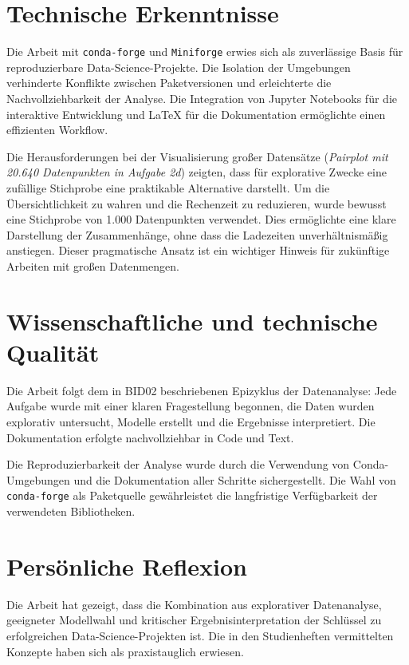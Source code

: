 \section{Technische Erkenntnisse}

Die Arbeit mit \texttt{conda-forge} und \texttt{Miniforge} erwies sich als zuverlässige Basis für reproduzierbare Data-Science-Projekte. Die Isolation der Umgebungen verhinderte Konflikte zwischen Paketversionen und erleichterte die Nachvollziehbarkeit der Analyse. Die Integration von Jupyter Notebooks für die interaktive Entwicklung und \LaTeX{} für die Dokumentation ermöglichte einen effizienten Workflow.

Die Herausforderungen bei der Visualisierung großer Datensätze (\textit{Pairplot mit 20.640 Datenpunkten in Aufgabe 2d}) zeigten, dass für explorative Zwecke eine zufällige Stichprobe eine praktikable Alternative darstellt. Um die Übersichtlichkeit zu wahren und die Rechenzeit zu reduzieren, wurde bewusst eine Stichprobe von 1.000 Datenpunkten verwendet. Dies ermöglichte eine klare Darstellung der Zusammenhänge, ohne dass die Ladezeiten unverhältnismäßig anstiegen. Dieser pragmatische Ansatz ist ein wichtiger Hinweis für zukünftige Arbeiten mit großen Datenmengen.

\section{Wissenschaftliche und technische Qualität}

Die Arbeit folgt dem in BID02 beschriebenen Epizyklus der Datenanalyse: Jede Aufgabe wurde mit einer klaren Fragestellung begonnen, die Daten wurden explorativ untersucht, Modelle erstellt und die Ergebnisse interpretiert. Die Dokumentation erfolgte nachvollziehbar in Code und Text.

Die Reproduzierbarkeit der Analyse wurde durch die Verwendung von Conda-Umgebungen und die Dokumentation aller Schritte sichergestellt. Die Wahl von \texttt{conda-forge} als Paketquelle gewährleistet die langfristige Verfügbarkeit der verwendeten Bibliotheken.

\section{Persönliche Reflexion}

Die Arbeit hat gezeigt, dass die Kombination aus explorativer Datenanalyse, geeigneter Modellwahl und kritischer Ergebnisinterpretation der Schlüssel zu erfolgreichen Data-Science-Projekten ist. Die in den Studienheften vermittelten Konzepte haben sich als praxistauglich erwiesen.

